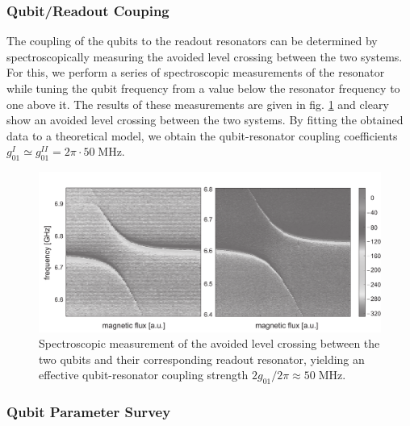 \subsubsection{Qubit/Readout Couping}

The coupling of the qubits to the readout resonators can be determined by spectroscopically measuring the avoided level crossing between the two systems. For this, we perform a series of spectroscopic measurements of the resonator while tuning the qubit frequency from a value below the resonator frequency to one above it. The results of these measurements are given in fig. \ref{fig:qubit_resonator_anticrossing} and cleary show an avoided level crossing between the two systems. By fitting the obtained data to a theoretical model, we obtain the qubit-resonator coupling coefficients $g_{01}^I \simeq g_{01}^{II} = 2\pi\cdot 50 \; \mathrm{MHz}$.

\begin{figure}[htb!]
	\centering
	\includegraphics[width=1\textwidth]{"./data/ct5/cavity anticrossing/qubits_anticrossing_bw"}
	\caption[Spectroscopic measurement of the avoided level crossing between the two qubits and their corresponding readout resonator]{Spectroscopic measurement of the avoided level crossing between the two qubits and their corresponding readout resonator, yielding an effective qubit-resonator coupling strength $2g_{01}/2\pi\approx 50\;\mathrm{MHz}$.}
	\label{fig:qubit_resonator_anticrossing}
\end{figure}


\subsubsection{Qubit Parameter Survey}

